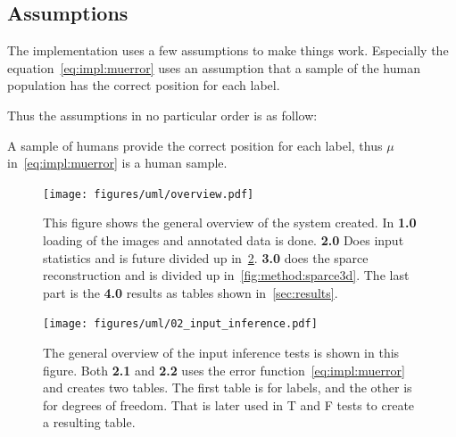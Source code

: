 
\subsection{Assumptions}%
\label{sub:assumptions}
The implementation uses a few assumptions to make things work.
Especially the equation~\ref{eq:impl:muerror} uses an assumption that a sample of the human population has the correct position for each label.

Thus the assumptions in no particular order is as follow:
\begin{itemize}
    \itemize A sample of humans provide the correct position for each label, thus $\mu$ in~\ref{eq:impl:muerror} is a human sample.
\end{itemize}




\begin{figure}
\begin{center}
    \texttt{[image: figures/uml/overview.pdf]}
\end{center}
\caption{This figure shows the general overview of the system created. In \textbf{1.0} loading of the images and annotated data is done.
    \textbf{2.0} Does input statistics and is future divided up in~\ref{fig:method:inference}. \textbf{3.0} does the sparce reconstruction and is divided up in~\ref{fig:method:sparce3d}.
The last part is the \textbf{4.0} results as tables shown in~\ref{sec:results}.}\label{fig:method:overview}
\end{figure}

\begin{figure}
\begin{center}
    \texttt{[image: figures/uml/02\_input\_inference.pdf]}
\end{center}
\caption{The general overview of the input inference tests is shown in this figure.
    Both \textbf{2.1} and \textbf{2.2} uses the error function~\ref{eq:impl:muerror} and creates two tables. The first table is for labels, and the other is for degrees of freedom. That is later used in T and F tests to create a resulting table.
}
\label{fig:method:inference}
\end{figure}


